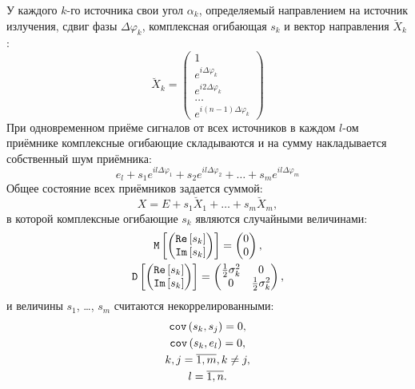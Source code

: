 У каждого $k$-го источника свои угол $\alpha_k$, определяемый направлением на источник излучения, сдвиг фазы $\Delta \varphi_k$, комплексная огибающая $s_k$ и
вектор направления $\breve{X}_k$:
\[
    \breve{X}_k =
    \begin{pmatrix}
        1                        \\
        e^{i \Delta \varphi_k}   \\
        e^{i 2 \Delta \varphi_k} \\
        \dots                    \\
        e^{i (n-1) \Delta \varphi_k}
    \end{pmatrix}
\]
При одновременном приёме сигналов от всех источников в каждом $l$-ом приёмнике комплексные огибающие складываются и на сумму накладывается собственный шум приёмника:
\[
    e_l + s_1 e^{i l \Delta \varphi_1} + s_2 e^{i l \Delta \varphi_2} + \dots + s_m e^{i l \Delta \varphi_m}
\]
Общее состояние всех приёмников задается суммой:
\[
    X = E + s_1 \breve{X}_1 + \dots + s_m \breve{X}_m ,
\]
в которой комплексные огибающие $s_k$ являются случайными величинами:
\begin{gather*}
    \mathtt{M} \left [ 
        \begin{pmatrix}
            \mathtt{Re} \left [ s_k \right ] \\ \mathtt{Im} \left [ s_k \right ]
        \end{pmatrix}
     \right ] =
    \begin{pmatrix}
        0 \\
        0
    \end{pmatrix} , \\
    \mathtt{D} \left [ 
        \begin{pmatrix}
            \mathtt{Re} \left [ s_k \right ] \\ \mathtt{Im} \left [ s_k \right ]
        \end{pmatrix}
     \right ] =
    \begin{pmatrix}
        \frac{1}{2} \sigma_k^2 & 0                      \\
        0                      & \frac{1}{2} \sigma_k^2
    \end{pmatrix} ,
\end{gather*}
и величины $s_1$, \dots, $s_m$ считаются некоррелированными:
\begin{gather*}
    \mathtt{cov} \left ( s_k, s_j \right ) = 0 , \\
    \mathtt{cov} \left ( s_k, e_l \right ) = 0 , \\
    k,j = \overline{1,m}, k \neq j, \\
    l = \overline{1, n} .
\end{gather*}

